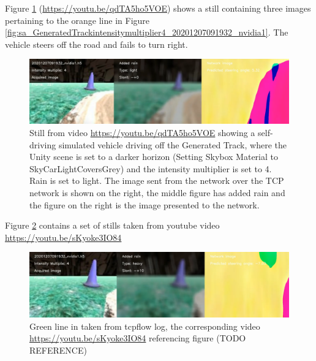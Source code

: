 Figure \ref{fig:youtube20201207091932nvidia1lightrainmult_4_h5} (\url{https://youtu.be/qdTA5ho5VOE}) shows a still containing three images pertaining to the orange line in Figure \ref{fig:sa_GeneratedTrackintensitymultiplier4_20201207091932_nvidia1}. The vehicle steers off the road and fails to turn right.

\begin{figure}[ht]
 \centering 
 \includegraphics[width=\textwidth]{Figures/youtube20201207091932nvidia1lightrainmult_4_h5.png}
 \caption{Still from video \url{https://youtu.be/qdTA5ho5VOE} showing a self-driving simulated vehicle driving off the Generated Track, where the Unity scene is set to a darker horizon (Setting Skybox Material to SkyCarLightCoversGrey) and the intensity multiplier is set to 4. Rain is set to light. The image sent from the network over the TCP network is shown on the right, the middle figure has added rain and the figure on the right is the image presented to the network.}
 \label{fig:youtube20201207091932nvidia1lightrainmult_4_h5} 
\end{figure}

Figure \ref{fig:youtube20201207091932nvidia1heavy10mult_4_h5} contains a set of stills taken from youtube video \url{https://youtu.be/sKyoke3IO84}
\begin{figure}[ht]
 \centering 
 \includegraphics[width=\textwidth]{Figures/youtube20201207091932nvidia1heavy10mult_4_h5.png}
 \caption{Green line in taken from tcpflow log, the corresponding video \url{https://youtu.be/sKyoke3IO84} referencing figure (TODO REFERENCE)}
 \label{fig:youtube20201207091932nvidia1heavy10mult_4_h5} 
\end{figure}


